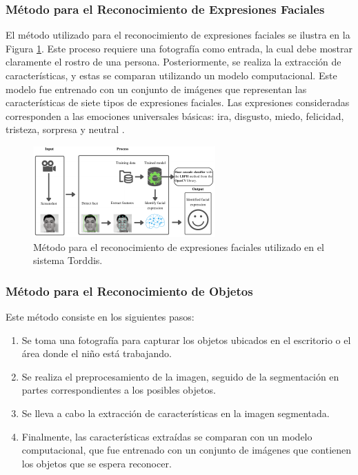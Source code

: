\documentclass[a4paper,fleqn]{cas-sc}
\begin{document}
	\subsubsection{Método para el Reconocimiento de Expresiones Faciales}
	El método utilizado para el reconocimiento de expresiones faciales se ilustra en la Figura \ref{fig:FacialExpression}. Este proceso requiere una fotografía como entrada, la cual debe mostrar claramente el rostro de una persona. Posteriormente, se realiza la extracción de características, y estas se comparan utilizando un modelo computacional. Este modelo fue entrenado con un conjunto de imágenes que representan las características de siete tipos de expresiones faciales. Las expresiones consideradas corresponden a las emociones universales básicas: ira, disgusto, miedo, felicidad, tristeza, sorpresa y neutral \citep{Zhang2022}.
	
	\begin{figure}[hbt!]
		\centering
		\includegraphics[frame,scale=0.5, width=\linewidth]{figs/Figure_2}
		\caption{Método para el reconocimiento de expresiones faciales utilizado en el sistema Torddis.\label{fig:FacialExpression}}
	\end{figure} 
	
	\subsubsection{Método para el Reconocimiento de Objetos}
	Este método consiste en los siguientes pasos:
	\begin{enumerate}
		\item Se toma una fotografía para capturar los objetos ubicados en el escritorio o el área donde el niño está trabajando.
		\item Se realiza el preprocesamiento de la imagen, seguido de la segmentación en partes correspondientes a los posibles objetos.
		\item Se lleva a cabo la extracción de características en la imagen segmentada.
		\item Finalmente, las características extraídas se comparan con un modelo computacional, que fue entrenado con un conjunto de imágenes que contienen los objetos que se espera reconocer.
	\end{enumerate}
	
\end{document}
